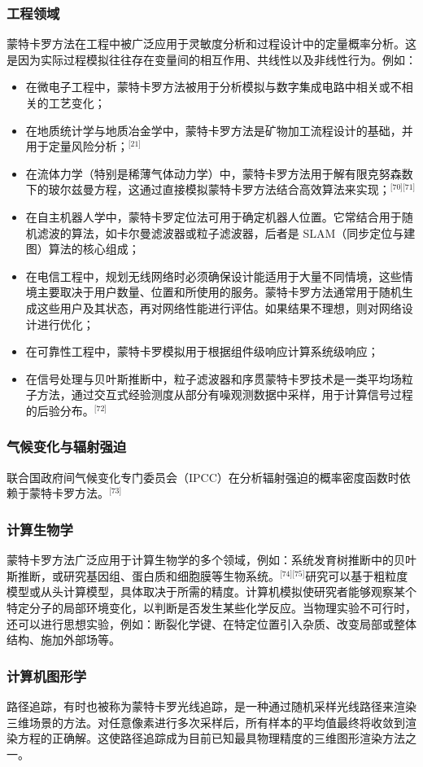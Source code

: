 \subsubsection{工程领域}
蒙特卡罗方法在工程中被广泛应用于灵敏度分析和过程设计中的定量概率分析。这是因为实际过程模拟往往存在变量间的相互作用、共线性以及非线性行为。例如：
\begin{itemize}
\item 在微电子工程中，蒙特卡罗方法被用于分析模拟与数字集成电路中相关或不相关的工艺变化；
\item 在地质统计学与地质冶金学中，蒙特卡罗方法是矿物加工流程设计的基础，并用于定量风险分析；\(^\text{[21]}\)
\item 在流体力学（特别是稀薄气体动力学）中，蒙特卡罗方法用于解有限克努森数下的玻尔兹曼方程，这通过直接模拟蒙特卡罗方法结合高效算法来实现；\(^\text{[70][71]}\)
\item 在自主机器人学中，蒙特卡罗定位法可用于确定机器人位置。它常结合用于随机滤波的算法，如卡尔曼滤波器或粒子滤波器，后者是 SLAM（同步定位与建图）算法的核心组成；
\item 在电信工程中，规划无线网络时必须确保设计能适用于大量不同情境，这些情境主要取决于用户数量、位置和所使用的服务。蒙特卡罗方法通常用于随机生成这些用户及其状态，再对网络性能进行评估。如果结果不理想，则对网络设计进行优化；
\item 在可靠性工程中，蒙特卡罗模拟用于根据组件级响应计算系统级响应；
\item 在信号处理与贝叶斯推断中，粒子滤波器和序贯蒙特卡罗技术是一类平均场粒子方法，通过交互式经验测度从部分有噪观测数据中采样，用于计算信号过程的后验分布。\(^\text{[72]}\)
\end{itemize}
\subsubsection{气候变化与辐射强迫}
联合国政府间气候变化专门委员会（IPCC）在分析辐射强迫的概率密度函数时依赖于蒙特卡罗方法。\(^\text{[73]}\)
\subsubsection{计算生物学}
蒙特卡罗方法广泛应用于计算生物学的多个领域，例如：系统发育树推断中的贝叶斯推断，或研究基因组、蛋白质和细胞膜等生物系统。\(^\text{[74][75]}\)研究可以基于粗粒度模型或从头计算模型，具体取决于所需的精度。计算机模拟使研究者能够观察某个特定分子的局部环境变化，以判断是否发生某些化学反应。当物理实验不可行时，还可以进行思想实验，例如：断裂化学键、在特定位置引入杂质、改变局部或整体结构、施加外部场等。
\subsubsection{计算机图形学}
路径追踪，有时也被称为蒙特卡罗光线追踪，是一种通过随机采样光线路径来渲染三维场景的方法。对任意像素进行多次采样后，所有样本的平均值最终将收敛到渲染方程的正确解。这使路径追踪成为目前已知最具物理精度的三维图形渲染方法之一。
